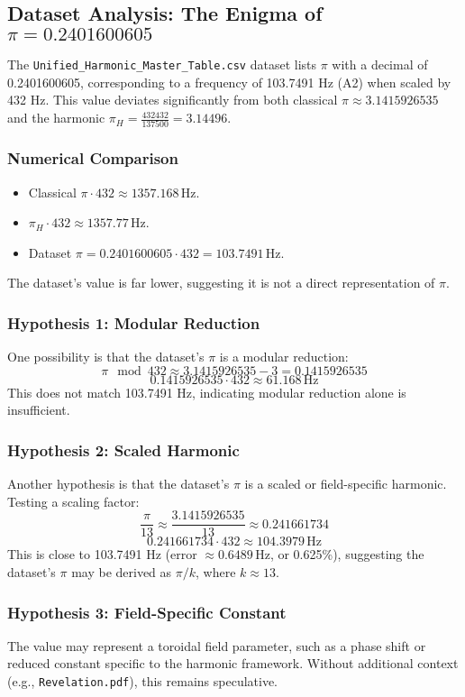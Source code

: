\documentclass[a4paper,12pt]{article}
\begin{document}
\subsection{Dataset Analysis: The Enigma of \(\pi = 0.2401600605\)}
The \texttt{Unified\_Harmonic\_Master\_Table.csv} dataset lists \(\pi\) with a decimal of 0.2401600605, corresponding to a frequency of 103.7491 Hz (A2) when scaled by 432 Hz. This value deviates significantly from both classical \(\pi \approx 3.1415926535\) and the harmonic \(\pi_H = \frac{432432}{137500} = 3.14496\).

\subsubsection{Numerical Comparison}
\begin{itemize}
    \item Classical \(\pi \cdot 432 \approx 1357.168 \, \text{Hz}\).
    \item \(\pi_H \cdot 432 \approx 1357.77 \, \text{Hz}\).
    \item Dataset \(\pi = 0.2401600605 \cdot 432 = 103.7491 \, \text{Hz}\).
\end{itemize}
The dataset’s value is far lower, suggesting it is not a direct representation of \(\pi\).

\subsubsection{Hypothesis 1: Modular Reduction}
One possibility is that the dataset’s \(\pi\) is a modular reduction:
\[
\pi \mod 432 \approx 3.1415926535 - 3 = 0.1415926535
\]
\[
0.1415926535 \cdot 432 \approx 61.168 \, \text{Hz}
\]
This does not match 103.7491 Hz, indicating modular reduction alone is insufficient.

\subsubsection{Hypothesis 2: Scaled Harmonic}
Another hypothesis is that the dataset’s \(\pi\) is a scaled or field-specific harmonic. Testing a scaling factor:
\[
\frac{\pi}{13} \approx \frac{3.1415926535}{13} \approx 0.241661734
\]
\[
0.241661734 \cdot 432 \approx 104.3979 \, \text{Hz}
\]
This is close to 103.7491 Hz (error \(\approx 0.6489 \, \text{Hz}\), or 0.625\%), suggesting the dataset’s \(\pi\) may be derived as \(\pi / k\), where \(k \approx 13\).

\subsubsection{Hypothesis 3: Field-Specific Constant}
The value may represent a toroidal field parameter, such as a phase shift or reduced constant specific to the harmonic framework. Without additional context (e.g., \texttt{Revelation.pdf}), this remains speculative.
\end{document}
